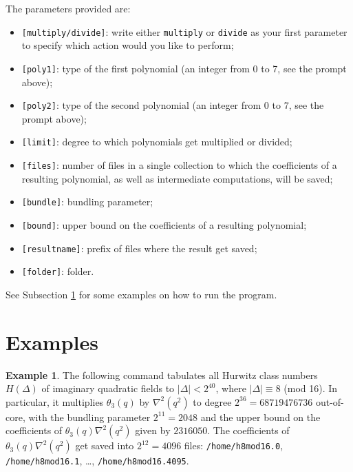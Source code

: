 \documentclass[a4paper,10pt]{article}
\newcommand{\code}{\lstinline}
\begin{document}
The parameters provided are:

\begin{itemize}
\item \code{[multiply/divide]}: write either \code{multiply} or \code{divide} as your first parameter to specify which action would you like to perform;

\item \code{[poly1]}: type of the first polynomial (an integer from 0 to 7, see the prompt above);

\item \code{[poly2]}: type of the second polynomial (an integer from 0 to 7, see the prompt above);

\item \code{[limit]}: degree to which polynomials get multiplied or divided;

\item \code{[files]}: number of files in a single collection to which the coefficients of a resulting polynomial, as well as intermediate computations, will be saved;

\item \code{[bundle]}: bundling parameter;

\item \code{[bound]}: upper bound on the coefficients of a resulting polynomial;

\item \code{[resultname]}: prefix of files where the result get saved;

\item \code{[folder]}: folder.
\end{itemize}

See Subsection \ref{sec:polymult_examples} for some examples on how to run the program.

\section{Examples} \label{sec:polymult_examples}

\textbf{Example 1}. The following command tabulates all Hurwitz class numbers $H(\Delta)$ of imaginary quadratic fields to $|\Delta| < 2^{40}$, where $|\Delta| \equiv 8$ (mod 16). In particular, it multiplies $\theta_3(q)$ by $\nabla^2(q^2)$ to degree $2^{36}=68719476736$ out-of-core, with the bundling parameter $2^{11}=2048$ and the upper bound on the coefficients of $\theta_3(q)\nabla^2(q^2)$ given by $2316050$. The coefficients of $\theta_3(q)\nabla^2(q^2)$ get saved into $2^{12}=4096$ files: \code{/home/h8mod16.0}, \code{/home/h8mod16.1}, \ldots, \code{/home/h8mod16.4095}.
\end{document}
